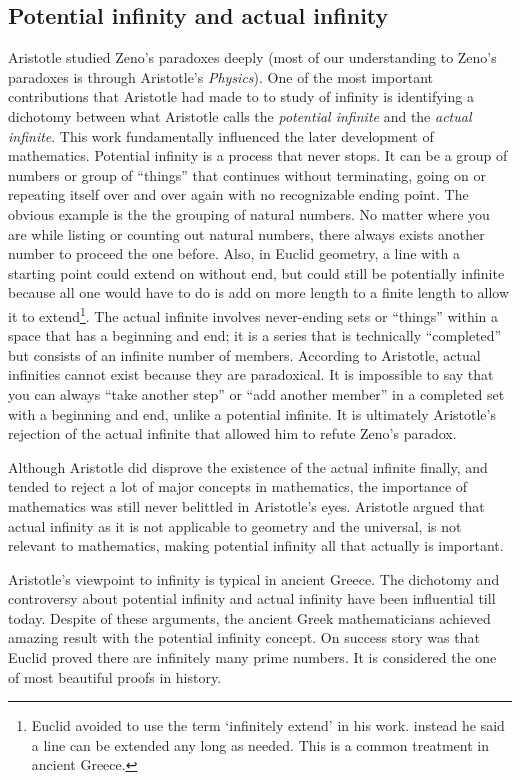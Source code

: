 \documentclass{article}
\begin{document}
\subsection{Potential infinity and actual infinity}
 

Aristotle studied Zeno's paradoxes deeply (most of our understanding to Zeno's paradoxes is through Aristotle's {\em Physics}). One of the most important contributions that Aristotle had made to to study of infinity is identifying a dichotomy between what Aristotle calls the {\em potential infinite} and the {\em actual infinite}. This work fundamentally influenced the later development of mathematics\cite{HanXueTao16}. Potential infinity is a process that never stops. It can be a group of numbers or group of ``things'' that continues without terminating, going on or repeating itself over and over again with no recognizable ending point. The obvious example is the the grouping of natural numbers. No matter where you are while listing or counting out natural numbers, there always exists another number to proceed the one before. Also, in Euclid geometry, a line with a starting point could extend on without end, but could still be potentially infinite because all one would have to do is add on more length to a finite length to allow it to extend\footnote{Euclid avoided to use the term `infinitely extend' in his work. instead he said a line can be extended any long as needed. This is a common treatment in ancient Greece.}. The actual infinite involves  never-ending sets or ``things'' within a space that has a beginning and end; it is a series that is technically ``completed'' but consists of an infinite number of members. According to Aristotle, actual infinities cannot exist because they are paradoxical. It is impossible to say that you can always ``take another step'' or ``add another member'' in a completed set with a beginning and end, unlike a potential infinite. It is ultimately Aristotle’s rejection of the actual infinite that allowed him to refute Zeno’s paradox.

Although Aristotle did disprove the existence of the actual infinite finally, and tended to reject a lot of major concepts in mathematics, the importance of mathematics was still never belittled in Aristotle’s eyes. Aristotle argued that actual infinity as it is not applicable to geometry and the universal, is not relevant to mathematics, making potential infinity all that actually is important.

Aristotle's viewpoint to infinity is typical in ancient Greece. The dichotomy and controversy about potential infinity and actual infinity have been influential till today. Despite of these arguments, the ancient Greek mathematicians achieved amazing result with the potential infinity concept. On success story was that Euclid proved there are infinitely many prime numbers. It is considered the one of most beautiful proofs in history.
\end{document}
